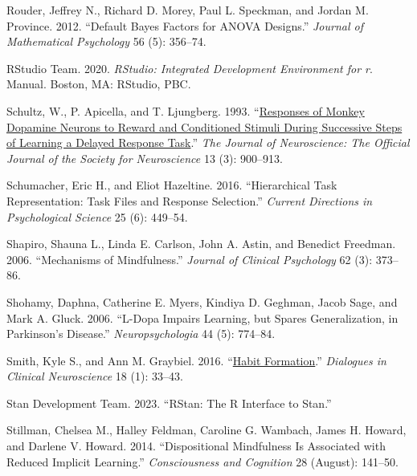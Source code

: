 \documentclass{article}
\newlength{\cslhangindent}
\newlength{\cslentryspacingunit} %
\newenvironment{CSLReferences}[2] %
 {%
  \setlength{\parindent}{0pt}
  \ifodd #1
  \let\oldpar\par
  \def\par{\hangindent=\cslhangindent\oldpar}
  \fi
  \setlength{\parskip}{#2\cslentryspacingunit}
 }%
 {}
\begin{document}
\begin{CSLReferences}{1}{0}
\leavevmode{}%
Rouder, Jeffrey N., Richard D. Morey, Paul L. Speckman, and Jordan M.
Province. 2012. {``Default {Bayes} Factors for {ANOVA} Designs.''}
\emph{Journal of Mathematical Psychology} 56 (5): 356--74.

\leavevmode{}%
RStudio Team. 2020. \emph{{RStudio}: {Integrated} Development
Environment for r}. Manual. {Boston, MA}: {RStudio, PBC.}

\leavevmode{}%
Schultz, W., P. Apicella, and T. Ljungberg. 1993.
{``\href{https://www.ncbi.nlm.nih.gov/pmc/articles/PMC6576600}{Responses
of Monkey Dopamine Neurons to Reward and Conditioned Stimuli During
Successive Steps of Learning a Delayed Response Task}.''} \emph{The
Journal of Neuroscience: The Official Journal of the Society for
Neuroscience} 13 (3): 900--913.

\leavevmode{}%
Schumacher, Eric H., and Eliot Hazeltine. 2016. {``Hierarchical {Task
Representation}: {Task Files} and {Response Selection}.''} \emph{Current
Directions in Psychological Science} 25 (6): 449--54.

\leavevmode{}%
Shapiro, Shauna L., Linda E. Carlson, John A. Astin, and Benedict
Freedman. 2006. {``Mechanisms of Mindfulness.''} \emph{Journal of
Clinical Psychology} 62 (3): 373--86.

\leavevmode{}%
Shohamy, Daphna, Catherine E. Myers, Kindiya D. Geghman, Jacob Sage, and
Mark A. Gluck. 2006. {``L-Dopa Impairs Learning, but Spares
Generalization, in {Parkinson}'s Disease.''} \emph{Neuropsychologia} 44
(5): 774--84.

\leavevmode{}%
Smith, Kyle S., and Ann M. Graybiel. 2016.
{``\href{https://www.ncbi.nlm.nih.gov/pmc/articles/PMC4826769}{Habit
Formation}.''} \emph{Dialogues in Clinical Neuroscience} 18 (1): 33--43.

\leavevmode{}%
Stan Development Team. 2023. {``{RStan}: The {R} Interface to {Stan}.''}

\leavevmode{}%
Stillman, Chelsea M., Halley Feldman, Caroline G. Wambach, James H.
Howard, and Darlene V. Howard. 2014. {``Dispositional Mindfulness Is
Associated with Reduced Implicit Learning.''} \emph{Consciousness and
Cognition} 28 (August): 141--50.


\end{CSLReferences}
\end{document}
